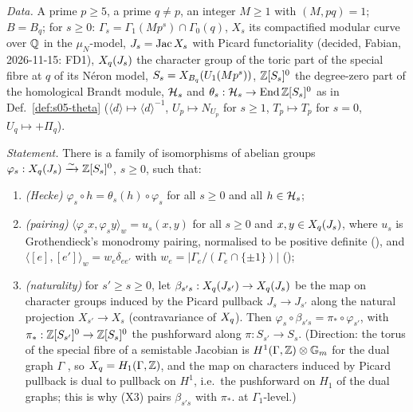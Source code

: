\begin{hypothesis}\label{hyp:s05-X}
\emph{Data.} A prime $p\ge5$, a prime $q\ne p$, an integer $M\ge1$ with $(M,pq)=1$; $B=B_q$; for $s\ge0$:
$\Gamma_s=\Gamma_1(Mp^s)\cap\Gamma_0(q)$, $X_s$ its compactified modular curve over $\mathbb{Q}$ in the $\mu_N$-model, $J_s=\operatorname{Jac} X_s$ with Picard
functoriality (decided, Fabian, 2026-11-15: FD1), $X_q(J_s)$ the character group of the toric part of the special fibre at $q$ of its Néron model,
$S_s=X_{B_q}(U_1(Mp^s))$, $\mathbb{Z}[S_s]^0$ the degree-zero part of the homological Brandt module, $\mathcal{H}_s$ and
$\theta_s:\mathcal{H}_s\to\operatorname{End}\mathbb{Z}[S_s]^0$ as in Def.~\ref{def:s05-theta} ($\langle d\rangle\mapsto\langle d\rangle^{-1}$, $U_p\mapsto N_{U_p}$ for $s\ge1$,
$T_p\mapsto T_p$ for $s=0$, $U_q\mapsto+\Pi_q$).

\emph{Statement.} There is a family of isomorphisms of abelian groups $\varphi_s:X_q(J_s)\xrightarrow{\sim}\mathbb{Z}[S_s]^0$, $s\ge0$, such that:
\begin{enumerate}[label=(X\arabic*)]
\item \emph{(Hecke)} $\varphi_s\circ h=\theta_s(h)\circ\varphi_s$ for all $s\ge0$ and all $h\in\mathcal{H}_s$;
\item \emph{(pairing)} $\langle\varphi_sx,\varphi_sy\rangle_w=u_s(x,y)$ for all $s\ge0$ and $x,y\in X_q(J_s)$, where $u_s$ is Grothendieck's
  monodromy pairing, normalised to be positive definite (), and $\langle[e],[e']\rangle_w=w_e\delta_{ee'}$ with
  $w_e=|\Gamma_e/(\Gamma_e\cap\{\pm1\})|$ ();
\item \emph{(naturality)} for $s'\ge s\ge0$, let $\beta_{s's}:X_q(J_{s'})\to X_q(J_s)$ be the map on character groups induced by the
  Picard pullback $J_s\to J_{s'}$ along the natural projection $X_{s'}\to X_s$ (contravariance of $X_q$). Then
  $\varphi_s\circ\beta_{s's}=\pi_*\circ\varphi_{s'}$, with $\pi_*:\mathbb{Z}[S_{s'}]^0\to\mathbb{Z}[S_s]^0$ the pushforward along $\pi:S_{s'}\to S_s$. (Direction: the torus of the special fibre of a semistable Jacobian is
  $H^1(\Gamma,\mathbb{Z})\otimes\mathbb G_m$ for the dual graph $\Gamma$ , so $X_q=H_1(\Gamma,\mathbb{Z})$, and the map on characters induced by Picard pullback is dual to pullback on $H^1$, i.e.\
  the pushforward on $H_1$ of the dual graphs; this is why (X3) pairs $\beta_{s's}$ with $\pi_*$. \stsketch{} at $\Gamma_1$-level.)

\end{enumerate}
\end{hypothesis}

